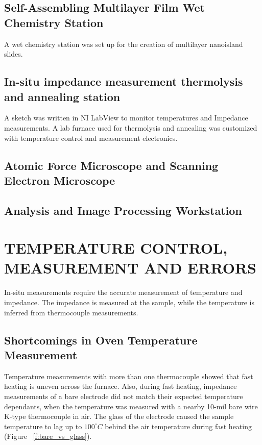 \documentclass[12pt,oneside,english]{article}
\begin{document}
    \subsection{Self-Assembling Multilayer Film Wet Chemistry Station}
        A wet chemistry station was set up for the creation of multilayer nanoisland slides.  

    \subsection{In-situ impedance measurement thermolysis and annealing station}
        A sketch was written in NI LabView to monitor temperatures and Impedance measurements.  
        A lab furnace used for thermolysis and annealing was customized with temperature control and measurement electronics.  

        \subsection{Atomic Force Microscope and Scanning Electron Microscope}


        \subsection{Analysis and Image Processing Workstation}


\section{TEMPERATURE CONTROL, MEASUREMENT AND ERRORS}

    In-situ measurements require the accurate measurement of temperature and impedance.  
    The impedance is measured at the sample, while the temperature is inferred from thermocouple measurements.
    
    \subsection{Shortcomings in Oven Temperature Measurement}
        
    Temperature measurements with more than one thermocouple showed that fast heating is uneven across the furnace.  
    Also, during fast heating, impedance measurements of a bare electrode did not match their expected temperature dependants, 
    when the temperature was measured with a nearby 10-mil bare wire K-type thermocouple in air.
    The glass of the electrode caused the sample temperature to lag up to $100^{\circ}C$ behind the air temperature during fast heating (Figure ~\ref{f:bare_vs_glass}).
\end{document}

